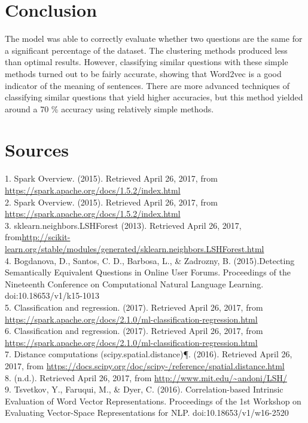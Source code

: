 \documentclass[9pt,twocolumn,twoside]{idsi}
\begin{document}
\section{Conclusion}
The model was able to correctly evaluate whether two questions are the same for a significant percentage of the dataset. The clustering methods produced less than optimal results. However, classifying similar questions with these simple methods turned out to be fairly accurate, showing that Word2vec is a good indicator of the meaning of sentences. 
There are more advanced techniques of classifying similar questions that yield higher accuracies, but this method yielded around a 70 \% accuracy using relatively simple methods.

\section{Sources}
1. Spark Overview. (2015). Retrieved April 26, 2017, from   	      \hspace{50mm}\url{https://spark.apache.org/docs/1.5.2/index.html}\\
2. Spark Overview. (2015). Retrieved April 26, 2017, from \url{https://spark.apache.org/docs/1.5.2/index.html}\\
3. sklearn.neighbors.LSHForest (2013). Retrieved April 26, 2017, from\url{http://scikit-learn.org/stable/modules/generated/sklearn.neighbors.LSHForest.html}\\
4. Bogdanova, D., Santos, C. D., Barbosa, L., \& Zadrozny, B. (2015).Detecting Semantically Equivalent Questions in Online User Forums. Proceedings of the Nineteenth Conference on Computational Natural Language Learning. doi:10.18653/v1/k15-1013\\
5. Classification and regression. (2017). Retrieved April 26, 2017, from \url{https://spark.apache.org/docs/2.1.0/ml-classification-regression.html} \\
6. Classification and regression. (2017). Retrieved April 26, 2017, from \url{https://spark.apache.org/docs/2.1.0/ml-classification-regression.html}\\
7. Distance computations (scipy.spatial.distance)¶. (2016). Retrieved April 26, 2017, from \url{https://docs.scipy.org/doc/scipy-/reference/spatial.distance.html} \\
8. (n.d.). Retrieved April 26, 2017, from \url{http://www.mit.edu/~andoni/LSH/}\\
9. Tsvetkov, Y., Faruqui, M., \& Dyer, C. (2016). Correlation-based Intrinsic Evaluation of Word Vector Representations. Proceedings of the 1st Workshop on Evaluating Vector-Space Representations for NLP. doi:10.18653/v1/w16-2520\\
\end{document}
